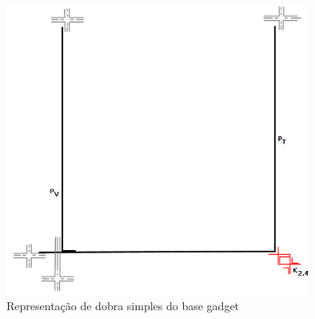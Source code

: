 \begin{figure}[htb]	
\center%
\includegraphics[width=10cm]{./img/gf2.png}
\caption{Representação de dobra simples do base gadget}
\label{fig:gadgetBaseSingleBend}
\end{figure}
